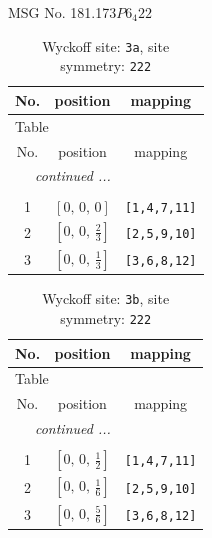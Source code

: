 \documentclass[fleqn,8pt]{jsarticle}
\begin{document}
\setcounter{MaxMatrixCols}{32}

\renewcommand{\tablename}{Table~}
\renewcommand{\figurename}{Figure~}
\begin{center}
\LARGE
MSG No. 181.173\quad$P6_{4}22$
\end{center}
\renewcommand{\arraystretch}{1.2}
\begin{longtable}{ccc}
\caption{Wyckoff site: {\tt 3a}, site symmetry: {\tt 222}}
 \\
 \hline \hline
No. & position & mapping \\ \hline \endfirsthead

\multicolumn{2}{l}{\tablename\ \thetable{}} \\
 \hline \hline
No. & position & mapping \\ \hline \endhead

 \hline \hline
\multicolumn{2}{r}{\footnotesize\it continued ...} \\ \endfoot

 \hline \hline
\multicolumn{2}{r}{} \\ \endlastfoot

1 & $\left[ 0,\, 0,\, 0 \right]$ & {\tt [1,4,7,11]} \\ \hline
2 & $\left[ 0,\, 0,\, \frac{2}{3} \right]$ & {\tt [2,5,9,10]} \\ \hline
3 & $\left[ 0,\, 0,\, \frac{1}{3} \right]$ & {\tt [3,6,8,12]} \\
\end{longtable}
\renewcommand{\arraystretch}{1.2}
\begin{longtable}{ccc}
\caption{Wyckoff site: {\tt 3b}, site symmetry: {\tt 222}}
 \\
 \hline \hline
No. & position & mapping \\ \hline \endfirsthead

\multicolumn{2}{l}{\tablename\ \thetable{}} \\
 \hline \hline
No. & position & mapping \\ \hline \endhead

 \hline \hline
\multicolumn{2}{r}{\footnotesize\it continued ...} \\ \endfoot

 \hline \hline
\multicolumn{2}{r}{} \\ \endlastfoot

1 & $\left[ 0,\, 0,\, \frac{1}{2} \right]$ & {\tt [1,4,7,11]} \\ \hline
2 & $\left[ 0,\, 0,\, \frac{1}{6} \right]$ & {\tt [2,5,9,10]} \\ \hline
3 & $\left[ 0,\, 0,\, \frac{5}{6} \right]$ & {\tt [3,6,8,12]} \\
\end{longtable}
\end{document}
